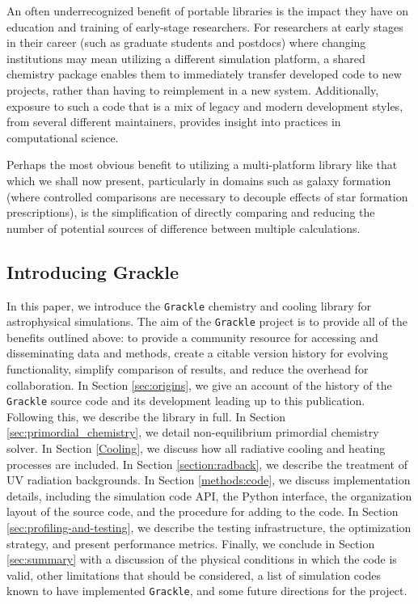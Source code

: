 An often underrecognized benefit of portable libraries
is the impact they have on education and training of early-stage researchers.
For researchers at early stages in their career (such as graduate students and
postdocs) where changing institutions may mean utilizing a different simulation
platform, a shared chemistry package enables them to immediately transfer
developed code to new projects, rather than having to reimplement in a new
system.  Additionally, exposure to such a code that is a mix
of legacy and modern development styles, from several different maintainers,
provides insight into practices in computational science.

Perhaps the most obvious benefit to utilizing a multi-platform library like
that which we shall now present, particularly in domains such as galaxy formation (where
controlled comparisons are necessary to decouple effects of star formation
prescriptions), is the simplification of directly comparing and reducing the
number of potential sources of difference between multiple calculations.

\subsection{Introducing Grackle}

In this paper, we introduce the \texttt{Grackle} chemistry and cooling
library for astrophysical simulations.  The aim of the
\texttt{Grackle} project is to provide all of the benefits outlined
above: to provide a community resource for accessing and disseminating
data and methods, create a citable version history for evolving
functionality, simplify comparison of results, and reduce the overhead
for collaboration.  In Section \ref{sec:origins}, we give an account
of the history of the \texttt{Grackle} source code and its development
leading up to this publication.  Following this, we describe the
library in full.  In Section \ref{sec:primordial_chemistry}, we detail
non-equilibrium primordial chemistry solver.  In Section
\ref{Cooling}, we discuss how all radiative cooling and heating
processes are included.  In Section \ref{section:radback}, we describe
the treatment of UV radiation backgrounds.  In Section
\ref{methods:code}, we discuss implementation details, including the
simulation code API, the Python interface, the organization layout of
the source code, and the procedure for adding to the code.  In Section
\ref{sec:profiling-and-testing}, we describe the testing
infrastructure, the optimization strategy, and present performance
metrics.  Finally, we conclude in Section \ref{sec:summary} with a
discussion of the physical conditions in which the code is valid,
other limitations that should be considered, a list of simulation
codes known to have implemented \texttt{Grackle}, and some future
directions for the project.

